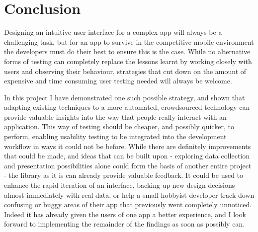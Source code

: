\chapter{Conclusion}

Designing an intuitive user interface for a complex app will always be a
challenging task, but for an app to survive in the competitive mobile
environment the developers must do their best to ensure this is the case.
While no alternative forms of testing can completely replace the lessons learnt
by working closely with users and observing their behaviour, strategies that
cut down on the amount of expensive and time consuming user testing needed
will always be welcome.

In this project I have demonstrated one such possible strategy, and shown 
that adapting existing techniques to a more automated, crowdsourced technology
can provide valuable insights into the way that people really interact with
an application. This way of testing should be cheaper, and possibly quicker, 
to perform, enabling usability testing to be integrated into the development
workflow in ways it could not be before. While there are definitely improvements that could be made,
and ideas that can be built upon - exploring data collection and presentation
possibilities alone could form the basis of another entire project - the library
as it is can already provide valuable feedback.
It could be used to enhance the rapid iteration of an interface, backing up new design decisions
almost immediately with real data, or help a small hobbyist developer
track down confusing or buggy areas of their app that previously went
completely unnoticed. Indeed it has already given the users of one app
a better experience, and I look forward to implementing the remainder
of the findings as soon as possibly can.